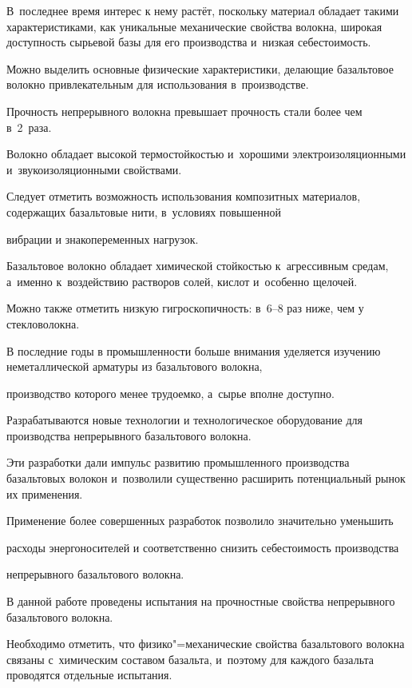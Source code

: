 В~последнее время интерес к нему растёт, поскольку материал обладает такими характеристиками, как уникальные механические свойства волокна, широкая доступность сырьевой базы для его производства и~низкая себестоимость. 

Можно выделить основные физические характеристики, делающие базальтовое волокно привлекательным для использования в~производстве. 

Прочность непрерывного волокна превышает прочность стали более чем в~2~раза. 

Волокно обладает высокой термостойкостью и~хорошими электроизоляционными и~звукоизоляционными свойствами. 

Следует отметить возможность использования композитных материалов, содержащих базальтовые нити, в~условиях повышенной

вибрации и знакопеременных нагрузок. 

Базальтовое волокно обладает химической стойкостью к~агрессивным средам, а~именно к~воздействию растворов солей, кислот и~особенно щелочей. 

Можно также отметить низкую гигроскопичность: в~6--8 раз ниже, чем у стекловолокна.



В последние годы в промышленности больше внимания уделяется изучению неметаллической арматуры из базальтового волокна,

производство которого менее трудоемко, а~сырье вполне доступно. 

Разрабатываются новые технологии и технологическое оборудование для производства непрерывного базальтового волокна. 

Эти разработки дали импульс развитию промышленного производства базальтовых волокон и~позволили существенно расширить потенциальный рынок их применения.



Применение более совершенных разработок позволило значительно уменьшить

расходы энергоносителей и соответственно снизить себестоимость производства

не\-прерывного базальтового волокна.



В данной работе проведены испытания на прочностные свойства непрерывного базальтового волокна. 

Необходимо отметить, что физико"=механические свойства базальтового волокна связаны с~химическим составом базальта, и~поэтому для каждого базальта проводятся отдельные испытания.



